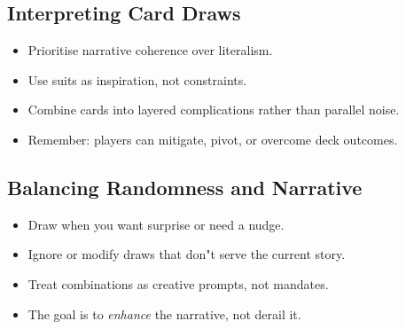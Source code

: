 \subsection{Interpreting Card Draws}\label{subsec:card_interpretation}
\begin{itemize}
    \item Prioritise narrative coherence over literalism.
    \item Use suits as inspiration, not constraints.
    \item Combine cards into layered complications rather than parallel noise.
    \item Remember: players can mitigate, pivot, or overcome deck outcomes.
\end{itemize}

\subsection{Balancing Randomness and Narrative}\label{subsec:balancing_randomness}
\begin{itemize}
    \item Draw when you want surprise or need a nudge.
    \item Ignore or modify draws that don"t serve the current story.
    \item Treat combinations as creative prompts, not mandates.
    \item The goal is to \emph{enhance} the narrative, not derail it.
\end{itemize}

